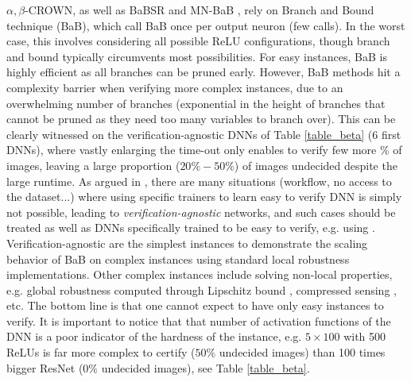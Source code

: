 $\alpha,\beta$-CROWN, as well as BaBSR \cite{BaB} and MN-BaB \cite{ferrari2022complete},
rely on Branch and Bound technique (BaB), which call BaB once per output neuron (few calls). In the worst case, this involves considering all possible ReLU configurations, though branch and bound typically circumvents most possibilities. For easy instances, BaB is highly efficient as all branches can be pruned early. However, BaB methods hit a complexity barrier when verifying more complex instances, due to an overwhelming number of branches (exponential in the height of branches that cannot be pruned as they need too many variables to branch over). This can be clearly witnessed on the verification-agnostic \cite{SDPFI} DNNs of Table \ref{table_beta} (6 first DNNs), where vastly enlarging the time-out only enables to verify few more \% of images, leaving a large proportion ($20\%-50\%$) of images undecided despite the large runtime. As argued in \cite{SDPFI}, there are many situations (workflow, no access to the dataset...) where using specific trainers to learn easy to verify DNN is simply not possible, leading to  {\em verification-agnostic} networks, and such cases should be treated as well as DNNs specifically trained to be easy to verify, e.g. using \cite{TrainingforVerification}. Verification-agnostic are the simplest instances to demonstrate the scaling behavior of BaB on complex instances using standard local robustness implementations. Other complex instances include solving non-local properties, e.g. global robustness computed through Lipschitz bound \cite{lipshitz}, compressed sensing \cite{sensing}, etc. The bottom line is that one cannot expect to have only easy instances to verify. It is important to notice that that number of activation functions of the DNN is a poor indicator of the hardness of the instance, e.g. $5 \times 100$ with 500 ReLUs is far more complex to certify ($50\%$ undecided images) than 100 times bigger ResNet ($0\%$ undecided images), see Table \ref{table_beta}.

		
		
